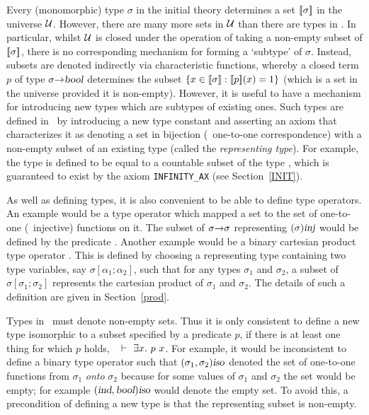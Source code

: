 Every (monomorphic) type $\sigma$ in the initial theory 
determines a set $[\![\sigma]\!]$ in the universe $\cal U$. However,
there are many more sets in $\cal U$ than there are types in
.  In particular, whilst $\cal U$ is closed under the
operation of taking a non-empty subset of $[\![\sigma]\!]$, there is no
corresponding mechanism for forming a `subtype' of $\sigma$. Instead,
subsets are denoted indirectly via characteristic functions, whereby a
closed term $p$ of type $\sigma{\to}\textsl{bool}$ determines the subset
$\{x\in[\![\sigma]\!] : [\![p]\!](x)=1\}$ (which is a set in the universe
provided it is non-empty).  However, it is useful to have a
mechanism for introducing new types which are subtypes of existing
ones. Such types are defined in \HOL\ by introducing a new type
constant and asserting an axiom that characterizes it as denoting a
set in bijection (\ie\ one-to-one correspondence) with a non-empty
subset of an existing type (called the {\it representing type\/}).
For example, the type  is defined to be equal to a countable
subset of the type , which is guaranteed to exist by the axiom
{\small\tt INFINITY\_AX} (see Section~\ref{INIT}).

As well as defining types, it is also convenient to be able to define
type operators.  An example would be a type operator  which
mapped a set to the set of one-to-one (\ie\ injective) functions on
it.  The subset of $\sigma{\to}\sigma$ representing $(\sigma)\textsl{inj}$
would be defined by the predicate \OneOne.  Another example would be a
binary cartesian product type operator .  This is defined by
choosing a representing type containing two type variables, say
$\sigma[\alpha_1;\alpha_2]$, such that for any types $\sigma_1$ and
$\sigma_2$, a subset of $\sigma[\sigma_1;\sigma_2]$ represents the
cartesian product of $\sigma_1$ and $\sigma_2$.  The details of such a
definition are given in Section~\ref{prod}.

Types in \HOL\ must denote non-empty sets.  Thus it is only
consistent to define a new type isomorphic to a
subset specified by a predicate $p$, if there is at least one thing
for which $p$ holds, \ie\ $\ \vdash\ \exists x.\ p\ x$.  For example, it
would be inconsistent to define a binary type operator  such
that $(\sigma_1,\sigma_2)\textsl{iso}$ denoted the set of one-to-one
functions from $\sigma_1$ {\em onto\/} $\sigma_2$ because for some
values of $\sigma_1$ and $\sigma_2$ the set would be empty; for
example $(\textsl{ind},\textsl{bool})\textsl{iso}$ would denote the empty set.  To
avoid this, a precondition of defining a new type is that the
representing subset is non-empty.

